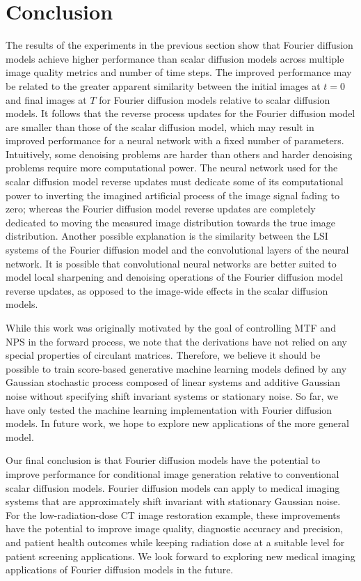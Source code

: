 \documentclass[12pt,]{article}
\begin{document}
\section{Conclusion}

\vspace{-2mm}

The results of the experiments in the previous section show that Fourier diffusion models achieve higher performance than scalar diffusion models across multiple image quality metrics and number of time steps. The improved performance may be related to the greater apparent similarity between the initial images at $t=0$ and final images at $T$ for Fourier diffusion models relative to scalar diffusion models. It follows that the reverse process updates for the Fourier diffusion model are smaller than those of the scalar diffusion model, which may result in improved performance for a neural network with a fixed number of parameters. Intuitively, some denoising problems are harder than others and harder denoising problems require more computational power. The neural network used for the scalar diffusion model reverse updates must dedicate some of its computational power to inverting the imagined artificial process of the image signal fading to zero; whereas the Fourier diffusion model reverse updates are completely dedicated to moving the measured image distribution towards the true image distribution. Another possible explanation is the similarity between the LSI systems of the Fourier diffusion model and the convolutional layers of the neural network. It is possible that convolutional neural networks are better suited to model local sharpening and denoising operations of the Fourier diffusion model reverse updates, as opposed to the image-wide effects in the scalar diffusion models. 

While this work was originally motivated by the goal of controlling MTF and NPS in the forward process, we note that the derivations have not relied on any special properties of circulant matrices.  Therefore, we believe it should be possible to train score-based generative machine learning models defined by any Gaussian stochastic process composed of linear systems and additive Gaussian noise without specifying shift invariant systems or stationary noise. So far, we have only tested the machine learning implementation with Fourier diffusion models. In future work, we hope to explore new applications of the more general model.

Our final conclusion is that Fourier diffusion models have the potential to improve performance for conditional image generation relative to conventional scalar diffusion models. Fourier diffusion models can apply to medical imaging systems that are approximately shift invariant with stationary Gaussian noise. For the low-radiation-dose CT image restoration example, these improvements have the potential to improve image quality, diagnostic accuracy and precision, and patient health outcomes while keeping radiation dose at a suitable level for patient screening applications. We look forward to exploring new medical imaging applications of Fourier diffusion models in the future.
\end{document}
